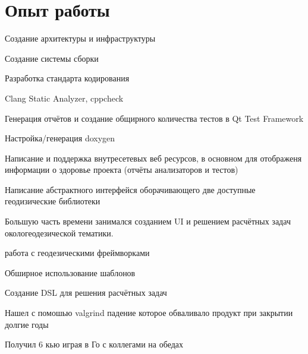 \documentclass[a4paper]{curricula-vitae}
\begin{document}
\hfill
\begin{minipage}[t]{0.66\textwidth} %

\section{Опыт работы} 


\vspace{\topsep} %
\begin{tightitemize}
\item Создание архитектуры и инфраструктуры
\item Создание системы сборки
\item Разработка стандарта кодирования
\item Clang Static Analyzer, cppcheck
\item Генерация отчётов и создание общирного количества тестов в Qt Test Framework
\item Настройка/генерация doxygen
\item Написание и поддержка внутресетевых веб ресурсов, в основном для отображеня
информации о здоровье проекта (отчёты анализаторов и тестов)
\item Написание абстрактного интерфейся оборачивающего две доступные геодизические библиотеки
\end{tightitemize}

\insertspace


Большую часть времени занимался созданием UI и
решением расчётных задач окологеодезической тематики.
\begin{tightitemize}
\item работа с геодезическими фреймворками
\item Обширное использование шаблонов
\item Создание DSL для решения расчётных задач
\item Нашел с помошью valgrind падение которое обваливало продукт при закрытии долгие годы
\item Получил 6 кью играя в Го с коллегами на обедах %
\end{tightitemize}


\end{minipage}
\end{document}
